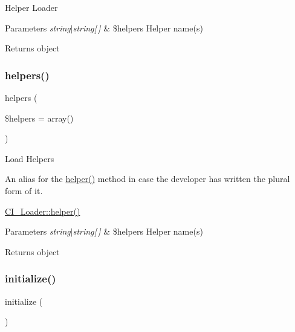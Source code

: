 Helper Loader


\begin{DoxyParams}{Parameters}
{\em string$\vert$string\mbox{[}$\,$\mbox{]}} & \$helpers Helper name(s) \\
\hline
\end{DoxyParams}
\begin{DoxyReturn}{Returns}
object 
\end{DoxyReturn}
\mbox{\label{class_c_i___loader_a2c39d50f31ce66ffe936e4f68219e275}} 
\subsubsection{\texorpdfstring{helpers()}{helpers()}}
{\footnotesize\ttfamily helpers (\begin{DoxyParamCaption}\item[{}]{\$helpers = {\ttfamily array()} }\end{DoxyParamCaption})}

Load Helpers

An alias for the \mbox{\hyperlink{class_c_i___loader_a2da00ff269596262b62c0c6032b2996f}{helper()}} method in case the developer has written the plural form of it.

\mbox{\hyperlink{class_c_i___loader_a2da00ff269596262b62c0c6032b2996f}{C\+I\+\_\+\+Loader\+::helper()}} 
\begin{DoxyParams}{Parameters}
{\em string$\vert$string\mbox{[}$\,$\mbox{]}} & \$helpers Helper name(s) \\
\hline
\end{DoxyParams}
\begin{DoxyReturn}{Returns}
object 
\end{DoxyReturn}
\mbox{\label{class_c_i___loader_a91098fa7d1917ce4833f284bbef12627}} 
\subsubsection{\texorpdfstring{initialize()}{initialize()}}
{\footnotesize\ttfamily initialize (\begin{DoxyParamCaption}{ }\end{DoxyParamCaption})}

